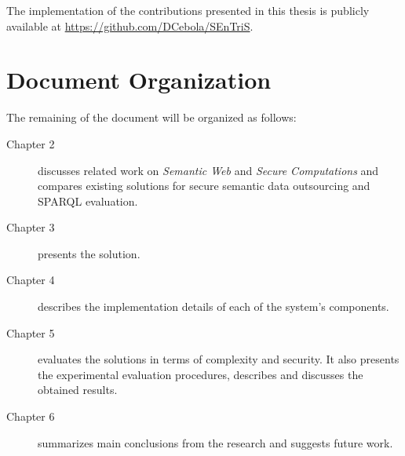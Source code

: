 The implementation of the contributions presented in this thesis is publicly available at \url{https://github.com/DCebola/SEnTriS}. 

\section{Document Organization}
\label{ch1:sec:organization}

The remaining of the document will be organized as follows:

\begin{description}
    \item [Chapter 2] discusses related work on \emph{Semantic Web} and \emph{Secure Computations} and compares existing solutions for secure semantic data outsourcing and \gls{SPARQL} evaluation.
    \item [Chapter 3] presents the solution.
    \item [Chapter 4] describes the implementation details of each of the system's components.
    \item [Chapter 5] evaluates the solutions in terms of complexity and security. It also presents the experimental evaluation procedures, describes and discusses the obtained results.
    \item [Chapter 6] summarizes main conclusions from the research and suggests future work.
\end{description}